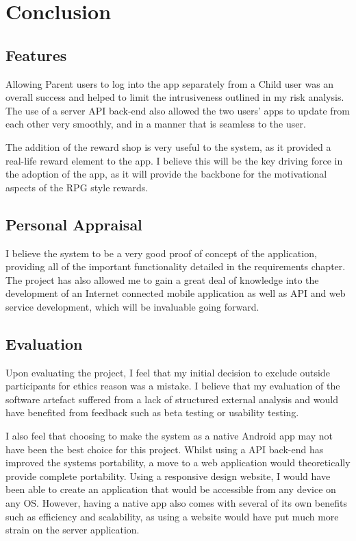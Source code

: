 \chapter{Conclusion}
\section{Features}
Allowing Parent users to log into the app separately from a Child user was an overall success and helped to limit the intrusiveness outlined in my risk analysis.
The use of a server API back-end also allowed the two users' apps to update from each other very smoothly, and in a manner that is seamless to the user.

The addition of the reward shop is very useful to the system, as it provided a real-life reward element to the app.
I believe this will be the key driving force in the adoption of the app, as it will provide the backbone for the motivational aspects of the RPG style rewards.

\section{Personal Appraisal}
I believe the system to be a very good proof of concept of the application, providing all of the important functionality detailed in the requirements chapter.
The project has also allowed me to gain a great deal of knowledge into the development of an Internet connected mobile application as well as API and web service development, which will be invaluable going forward.

\section{Evaluation}
Upon evaluating the project, I feel that my initial decision to exclude outside participants for ethics reason was a mistake. 
I believe that my evaluation of the software artefact suffered from a lack of structured external analysis and would have benefited from feedback such as beta testing or usability testing. 

I also feel that choosing to make the system as a native Android app may not have been the best choice for this project.
Whilst using a API back-end has improved the systems portability, a move to a web application would theoretically provide complete portability.
Using a responsive design website, I would have been able to create an application that would be accessible from any device on any OS.
However, having a native app also comes with several of its own benefits such as efficiency and scalability, as using a website would have put much more strain on the server application.

